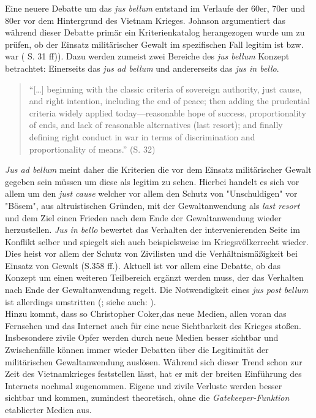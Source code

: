 \documentclass[11pt,a4paper,oneside,numbers=noenddot,bibliography=totocnumbered,DIV=13]{scrartcl}
\begin{document}
Eine neuere Debatte um das \textit{jus bellum} entstand im Verlaufe der 60er, 70er und 80er vor dem Hintergrund des Vietnam Krieges. Johnson argumentiert das während dieser Debatte primär ein Kriterienkatalog herangezogen wurde um zu prüfen, ob der Einsatz militärischer Gewalt im spezifischen Fall legitim ist bzw. war (\cite{johnson_contemporary_2013} S. 31 ff)).
Dazu werden zumeist zwei Bereiche des \textit{jus bellum} Konzept betrachtet: Einerseits das \textit{jus ad bellum} und andererseits das \textit{jus in bello}. 
\begin{quote}
“[…] beginning with the classic criteria of sovereign authority, just cause, and right intention, including the end of peace; then adding the prudential criteria widely applied today—reasonable hope of success, proportionality of ends, and lack of reasonable alternatives (last resort); and finally defining right conduct in war in terms of discrimination and proportionality of means.” (\cite{johnson_contemporary_2013}S. 32) \\
\end{quote}
\textit{Jus ad bellum} meint daher die Kriterien die vor dem Einsatz militärischer Gewalt gegeben sein müssen um diese als legitim zu sehen. Hierbei handelt es sich vor allem um den \textit{just cause} welcher vor allem den Schutz von "Unschuldigen" vor "Bösem", aus altruistischen Gründen, mit der Gewaltanwendung als \textit{last resort} und dem Ziel einen Frieden nach dem Ende der Gewaltanwendung wieder herzustellen.
 \textit{Jus in bello} bewertet das Verhalten der intervenierenden Seite im Konflikt selber und spiegelt sich auch beispielsweise im Kriegsvölkerrecht wieder. Dies heist vor allem der Schutz von Zivilisten und die Verhältnismäßigkeit bei Einsatz von Gewalt (\cite{rengger_just_2002}S.358 ff.). Aktuell ist vor allem eine Debatte, ob das Konzept um einen weiteren Teilbereich ergänzt werden muss, der das Verhalten nach Ende der Gewaltanwendung regelt. Die Notwendigkeit eines \textit{jus post bellum} ist allerdings umstritten (\cite{bellamy_responsibilities_2008}; siehe auch: \cite{banta_virtuous_2011}).\\    
Hinzu kommt, dass so Christopher Coker,das neue Medien, allen voran das Fernsehen und das Internet auch für eine neue Sichtbarkeit des Krieges stoßen. Insbesondere zivile Opfer werden durch neue Medien besser sichtbar und Zwischenfälle können immer wieder Debatten über die Legitimität der militärischen Gewaltanwendung auslösen. Während sich dieser Trend schon zur Zeit des Vietnamkrieges feststellen lässt, hat er mit der breiten Einführung des Internets nochmal zugenommen. Eigene und zivile Verluste werden besser sichtbar und kommen, zumindest theoretisch, ohne die \textit{Gatekeeper-Funktion} etablierter Medien aus.\\
\end{document}
